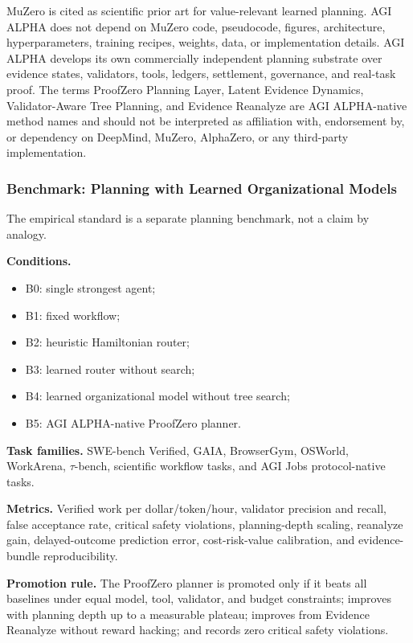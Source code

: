 \documentclass[11pt]{article}
\providecommand{\tightlist}{\setlength{\itemsep}{0pt}\setlength{\parskip}{0pt}}
\begin{document}
MuZero is cited as scientific prior art for value-relevant learned
planning. AGI ALPHA does not depend on MuZero code, pseudocode, figures,
architecture, hyperparameters, training recipes, weights, data, or
implementation details. AGI ALPHA develops its own commercially
independent planning substrate over evidence states, validators, tools,
ledgers, settlement, governance, and real-task proof. The terms
ProofZero Planning Layer, Latent Evidence Dynamics, Validator-Aware Tree
Planning, and Evidence Reanalyze are AGI ALPHA-native method names and
should not be interpreted as affiliation with, endorsement by, or
dependency on DeepMind, MuZero, AlphaZero, or any third-party
implementation.

\subsubsection{Benchmark: Planning with Learned Organizational
Models}\label{benchmark-planning-with-learned-organizational-models}

The empirical standard is a separate planning benchmark, not a claim by
analogy.

\textbf{Conditions.}

\begin{itemize}
\tightlist
\item
  B0: single strongest agent;
\item
  B1: fixed workflow;
\item
  B2: heuristic Hamiltonian router;
\item
  B3: learned router without search;
\item
  B4: learned organizational model without tree search;
\item
  B5: AGI ALPHA-native ProofZero planner.
\end{itemize}

\textbf{Task families.} SWE-bench Verified, GAIA, BrowserGym, OSWorld,
WorkArena, \(\tau\)-bench, scientific workflow tasks, and AGI Jobs
protocol-native tasks.

\textbf{Metrics.} Verified work per dollar/token/hour, validator
precision and recall, false acceptance rate, critical safety violations,
planning-depth scaling, reanalyze gain, delayed-outcome prediction
error, cost-risk-value calibration, and evidence-bundle reproducibility.

\textbf{Promotion rule.} The ProofZero planner is promoted only if it
beats all baselines under equal model, tool, validator, and budget
constraints; improves with planning depth up to a measurable plateau;
improves from Evidence Reanalyze without reward hacking; and records
zero critical safety violations.
\end{document}
